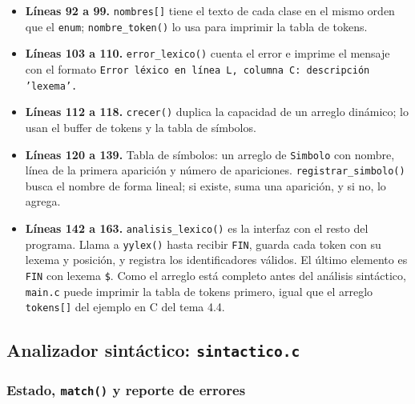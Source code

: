 \documentclass[12pt]{article}
\newcommand{\cmd}[1]{\texttt{\small #1}}
\begin{document}
\begin{itemize}[leftmargin=1.1cm,itemsep=0.25em]
\item \textbf{Líneas 92 a 99.} \cmd{nombres[]} tiene el texto de cada clase en el mismo orden que
el \cmd{enum}; \cmd{nombre\_token()} lo usa para imprimir la tabla de tokens.
\item \textbf{Líneas 103 a 110.} \cmd{error\_lexico()} cuenta el error e imprime el mensaje con
el formato \cmd{Error léxico en línea L, columna C: descripción 'lexema'.}
\item \textbf{Líneas 112 a 118.} \cmd{crecer()} duplica la capacidad de un arreglo dinámico; lo
usan el buffer de tokens y la tabla de símbolos.
\item \textbf{Líneas 120 a 139.} Tabla de símbolos: un arreglo de \cmd{Simbolo} con nombre,
línea de la primera aparición y número de apariciones. \cmd{registrar\_simbolo()} busca el nombre
de forma lineal; si existe, suma una aparición, y si no, lo agrega.
\item \textbf{Líneas 142 a 163.} \cmd{analisis\_lexico()} es la interfaz con el resto del
programa. Llama a \cmd{yylex()} hasta recibir \cmd{FIN}, guarda cada token con su lexema y
posición, y registra los identificadores válidos. El último elemento es \cmd{FIN} con lexema
\cmd{\$}. Como el arreglo está completo antes del análisis sintáctico, \cmd{main.c} puede
imprimir la tabla de tokens primero, igual que el arreglo \cmd{tokens[]} del ejemplo en C del
tema 4.4.
\end{itemize}

\subsection{Analizador sintáctico: \texttt{sintactico.c}}
\label{sec:sintactico}

\subsubsection*{Estado, \texttt{match()} y reporte de errores}


\end{document}
